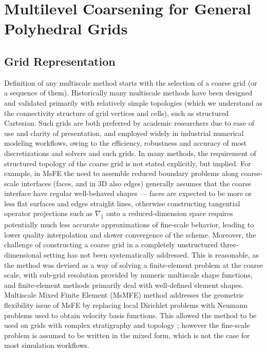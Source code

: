 \section{Multilevel Coarsening for General Polyhedral Grids}
\label{sec:msrsb_coarsening} 

\subsection{Grid Representation}
\label{subsec:msrsb_coarsening_grid}

Definition of any multiscale method starts with the selection of a coarse grid (or a sequence of them).   Historically many multiscale methods have been designed and validated primarily with relatively simple topologies (which we understand as the connectivity structure of grid vertices and cells), such as structured Cartesian.   Such grids are both preferred by academic researchers due to ease of use and clarity of presentation, and employed widely in industrial numerical modeling workflows, owing to the efficiency, robustness and accuracy of most discretizations and solvers and such grids.   In many methods, the requirement of structured topology of the coarse grid is not stated explicitly, but implied.   For example, in MsFE the need to assemble reduced boundary problems along coarse-scale interfaces (faces, and in 3D also edges) generally assumes that the coarse interface have regular well-behaved shapes --- faces are expected to be more or less flat surfaces and edges straight lines, otherwise constructing tangential operator projections such as $\nabla_{\parallel}$ onto a reduced-dimension space requires potentially much less accurate approximations of fine-scale behavior, leading to lower quality interpolation and slower convergence of the scheme.   Moreover, the challenge of constructing a coarse grid in a completely unstructured three-dimensional setting has not been systematically addressed.   This is reasonable, as the method was devised as a way of solving a finite-element problem at the coarse scale, with sub-grid resolution provided by numeric multiscale shape functions, and finite-element methods primarily deal with well-defined element shapes.   Multiscale Mixed Finite Element (MsMFE) method \cite{Chen2002} addresses the geometric flexibility issue of MsFE by replacing local Dirichlet problems with Neumann problems used to obtain velocity basis functions.   This allowed the method to be used on grids with complex stratigraphy and topology \cite{Aarnes2008,Alpak2012}; however the fine-scale problem is assumed to be written in the mixed form, which is not the case for most simulation workflows.


